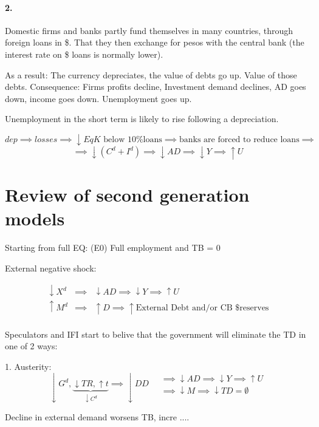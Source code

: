 \documentclass{report}
\begin{document}
\paragraph{2.} 

Domestic firms and banks partly fund themselves in many countries, through foreign loans in \$. That they then exchange for pesos with the central bank (the interest rate on \$ loans is normally lower). 

As a result: The currency depreciates, the value of debts go up. Value of those debts. Consequence: Firms profits decline, Investment demand declines, AD goes down, income goes down. Unemployment goes up. 

Unemployment in the short term is likely to rise following a depreciation.

$$dep \implies losses \implies \downarrow EqK \text{ below 10\% loans} \implies \text{banks are forced to reduce loans} \implies$$
$$\implies \downarrow (C^d+I^d) \implies \downarrow AD \implies \downarrow Y \implies \uparrow U$$

\section{Review of second generation models}

Starting from full EQ: (E0)
Full employment and TB = 0

External negative shock: 


$$\begin{array}{lcl}
\downarrow X^d & \implies & \downarrow AD \implies \downarrow Y \implies \uparrow U \\
\uparrow M^d & \implies & \uparrow D \implies \uparrow \text{External Debt and/or CB \$ reserves} \\
\end{array}$$

Speculators and IFI start to belive that the government will eliminate the TD in one of 2 ways:

1. Austerity: 
$$\downarrow G^d, \underbrace{\downarrow TR, \uparrow t}_{ \downarrow C^d} \implies \downarrow DD \quad  \begin{array}{|lll} \implies \downarrow AD \implies \downarrow Y \implies \uparrow U \\ \implies \downarrow M \implies \downarrow TD = \emptyset \end{array}$$


Decline in external demand worsens TB, incre .... 
\end{document}
